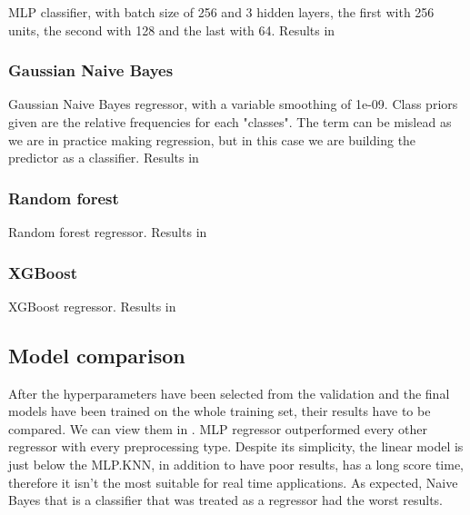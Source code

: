 MLP classifier, with batch size of 256 and 3 hidden layers, the first with 256 units, the second with 128 and the last with 64. Results in 



\subsubsection{Gaussian Naive Bayes}

Gaussian Naive Bayes regressor, with a variable smoothing of 1e-09. Class priors given are the relative frequencies for each "classes". The term can be mislead as we are in practice making regression, but in this case we are building the predictor as a classifier.
Results in 




\subsubsection{Random forest}

Random forest regressor.
Results in 




\subsubsection{XGBoost}

XGBoost regressor.
Results in 



\subsection{Model comparison}

After the hyperparameters have been selected from the validation and the final models have been trained on the whole training set, their results have to be compared. We can view them in .
MLP regressor outperformed every other regressor with every preprocessing type. Despite its simplicity, the linear model is just below the MLP.KNN, in addition to have poor results, has a long score time, therefore it isn't the most suitable for real time applications. As expected, Naive Bayes that is a classifier that was treated as a regressor had the worst results.

